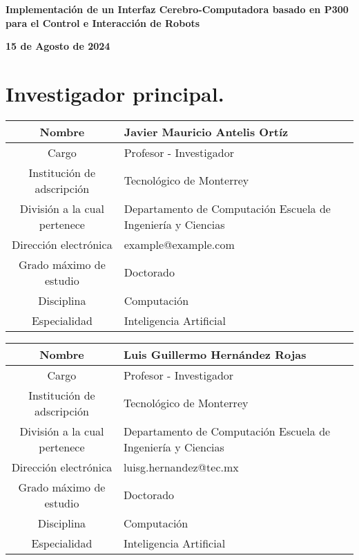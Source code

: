 \documentclass[12pt]{article}
\begin{document}
\begin{flushleft}
    \textbf{\Large Implementación de un Interfaz Cerebro-Computadora basado en P300 para el Control e Interacción de Robots}
    \par
    \textbf{15 de Agosto de 2024}
\end{flushleft}

\section{Investigador principal.}

\begin{table}[h!]
    \centering
    \begin{tabular}{|c|p{6cm}|} \hline
        Nombre & Javier Mauricio Antelis Ortíz \\ \hline
        Cargo & Profesor - Investigador \\ \hline
        Institución de adscripción & Tecnológico de Monterrey \\ \hline
        División a la cual pertenece & Departamento de Computación \newline Escuela de Ingeniería y Ciencias \\ \hline
        Dirección electrónica & example@example.com \\ \hline
        Grado máximo de estudio & Doctorado \\ \hline
        Disciplina & Computación \\ \hline
        Especialidad & Inteligencia Artificial \\ \hline
    \end{tabular}
\end{table}

\begin{table}[h!]
    \centering
    \begin{tabular}{|c|p{6cm}|} \hline
        Nombre & Luis Guillermo Hernández Rojas \\ \hline
        Cargo & Profesor - Investigador \\ \hline
        Institución de adscripción & Tecnológico de Monterrey \\ \hline
        División a la cual pertenece & Departamento de Computación \newline Escuela de Ingeniería y Ciencias \\ \hline
        Dirección electrónica & luisg.hernandez@tec.mx \\ \hline
        Grado máximo de estudio & Doctorado \\ \hline
        Disciplina & Computación \\ \hline
        Especialidad & Inteligencia Artificial \\ \hline
    \end{tabular}
\end{table}
\end{document}
